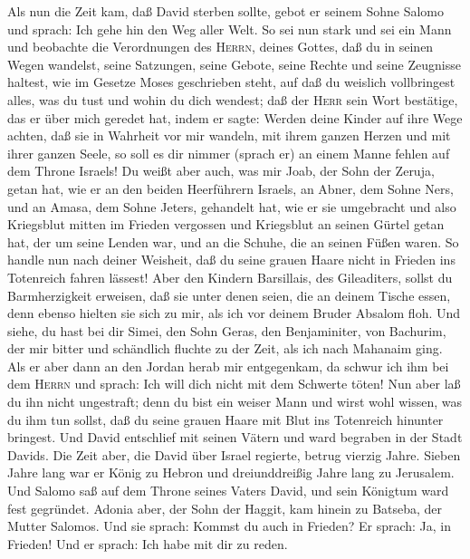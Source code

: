  Als nun die Zeit kam, daß David sterben sollte, gebot er
seinem Sohne Salomo und sprach:  Ich gehe hin den Weg
aller Welt. So sei nun stark und sei ein Mann  und
beobachte die Verordnungen des \textsc{Herrn}, deines Gottes, daß du in
seinen Wegen wandelst, seine Satzungen, seine Gebote, seine Rechte und
seine Zeugnisse haltest, wie im Gesetze Moses geschrieben steht, auf daß
du weislich vollbringest alles, was du tust und wohin du dich wendest;
 daß der \textsc{Herr} sein Wort bestätige, das er über
mich geredet hat, indem er sagte: Werden deine Kinder auf ihre Wege
achten, daß sie in Wahrheit vor mir wandeln, mit ihrem ganzen Herzen und
mit ihrer ganzen Seele, so soll es dir nimmer (sprach er) an einem Manne
fehlen auf dem Throne Israels!  Du weißt aber auch, was
mir Joab, der Sohn der Zeruja, getan hat, wie er an den beiden
Heerführern Israels, an Abner, dem Sohne Ners, und an Amasa, dem Sohne
Jeters, gehandelt hat, wie er sie umgebracht und also Kriegsblut mitten
im Frieden vergossen und Kriegsblut an seinen Gürtel getan hat, der um
seine Lenden war, und an die Schuhe, die an seinen Füßen waren.
 So handle nun nach deiner Weisheit, daß du seine grauen
Haare nicht in Frieden ins Totenreich fahren lässest! 
Aber den Kindern Barsillais, des Gileaditers, sollst du Barmherzigkeit
erweisen, daß sie unter denen seien, die an deinem Tische essen, denn
ebenso hielten sie sich zu mir, als ich vor deinem Bruder Absalom floh.
 Und siehe, du hast bei dir Simei, den Sohn Geras, den
Benjaminiter, von Bachurim, der mir bitter und schändlich fluchte zu der
Zeit, als ich nach Mahanaim ging. Als er aber dann an den Jordan herab
mir entgegenkam, da schwur ich ihm bei dem \textsc{Herrn} und sprach:
Ich will dich nicht mit dem Schwerte töten!  Nun aber laß
du ihn nicht ungestraft; denn du bist ein weiser Mann und wirst wohl
wissen, was du ihm tun sollst, daß du seine grauen Haare mit Blut ins
Totenreich hinunter bringest.  Und David entschlief mit
seinen Vätern und ward begraben in der Stadt Davids.  Die
Zeit aber, die David über Israel regierte, betrug vierzig Jahre. Sieben
Jahre lang war er König zu Hebron und dreiunddreißig Jahre lang zu
Jerusalem.  Und Salomo saß auf dem Throne seines Vaters
David, und sein Königtum ward fest gegründet.  Adonia
aber, der Sohn der Haggit, kam hinein zu Batseba, der Mutter Salomos.
Und sie sprach: Kommst du auch in Frieden? Er sprach: Ja, in Frieden!
 Und er sprach: Ich habe mit dir zu reden.
